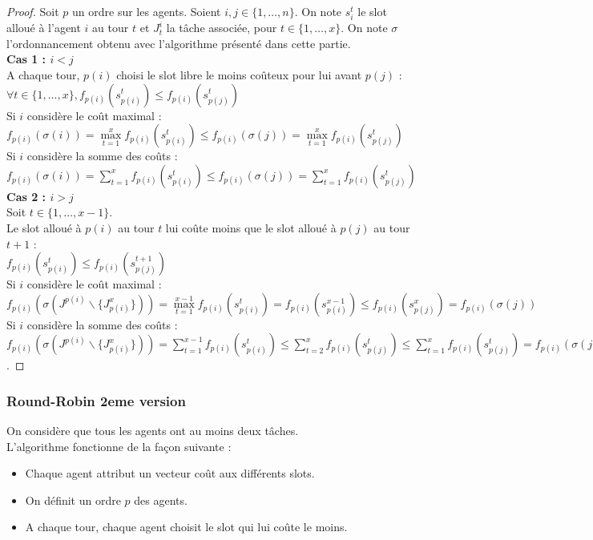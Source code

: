 \documentclass[12pt]{article}
\theoremstyle{definition}
\begin{document}
\begin{proof}
Soit $p$ un ordre sur les agents. Soient $i, j \in \{1, \dots, n\}$. On note $s_i^t$ le slot alloué à l'agent $i$ au tour $t$ et $J^i_t$ la tâche associée, pour $t\in\{1,\dots,x\}$. On note $\sigma$ l'ordonnancement obtenu avec l'algorithme présenté dans cette partie.\\
\textbf{Cas 1 : $i<j$}\\
A chaque tour, $p(i)$ choisi le slot libre le moins coûteux pour lui avant $p(j)$ :\\
 $\forall t\in \{1, \dots, x\}, f_{p(i)}(s^t_{p(i)})\leq f_{p(i)}(s^t_{p(j)})$\\
 Si $i$ considère le coût maximal : $f_{p(i)}(\sigma(i)) = \max\limits_{t = 1}^x f_{p(i)}(s^t_{p(i)}) \leq f_{p(i)}(\sigma(j)) = \max\limits_{t = 1}^x f_{p(i)}(s^t_{p(j)})$\\
 Si $i$ considère la somme des coûts : $f_{p(i)}(\sigma(i)) = \sum\limits_{t = 1}^x f_{p(i)}(s^t_{p(i)})\leq f_{p(i)}(\sigma(j)) = \sum\limits_{t = 1}^x f_{p(i)}(s^t_{p(j)})$\\
\textbf{Cas 2 : $i>j$}\\
Soit $t\in\{1,\dots,x-1\}$.\\
Le slot alloué à $p(i)$ au tour $t$ lui coûte moins que le slot alloué à $p(j)$ au tour $t+1$ : \\
$f_{p(i)}(s^t_{p(i)})\leq f_{p(i)}(s^{t+1}_{p(j)})$\\
Si $i$ considère le coût maximal : \\
$f_{p(i)}(\sigma(J^{p(i)}\backslash\{J_{p(i)}^x\})) = \max\limits_{t = 1}^{x-1} f_{p(i)}(s^t_{p(i)}) = f_{p(i)}(s^{x-1}_{p(i)}) \leq f_{p(i)}(s^x_{p(j)}) = f_{p(i)}(\sigma(j))$\\
Si $i$ considère la somme des coûts : \\
$f_{p(i)}(\sigma(J^{p(i)}\backslash\{J_{p(i)}^x\})) = \sum\limits_{t = 1}^{x-1} f_{p(i)}(s^t_{p(i)}) \leq \sum\limits_{t = 2}^{x} f_{p(i)}(s^t_{p(j)}) \leq \sum\limits_{t = 1}^{x} f_{p(i)}(s^t_{p(j)}) = f_{p(i)}(\sigma(j))$.
\end{proof}

\subsubsection{Round-Robin 2eme version}
\noindent
On considère que tous les agents ont au moins deux tâches.\\
L'algorithme fonctionne de la façon suivante :
\begin{itemize}
	\item Chaque agent attribut un vecteur coût aux différents slots.
	\item On définit un ordre $p$ des agents.
	\item A chaque tour, chaque agent choisit le slot qui lui coûte le moins.
\end{itemize}
\end{document}

